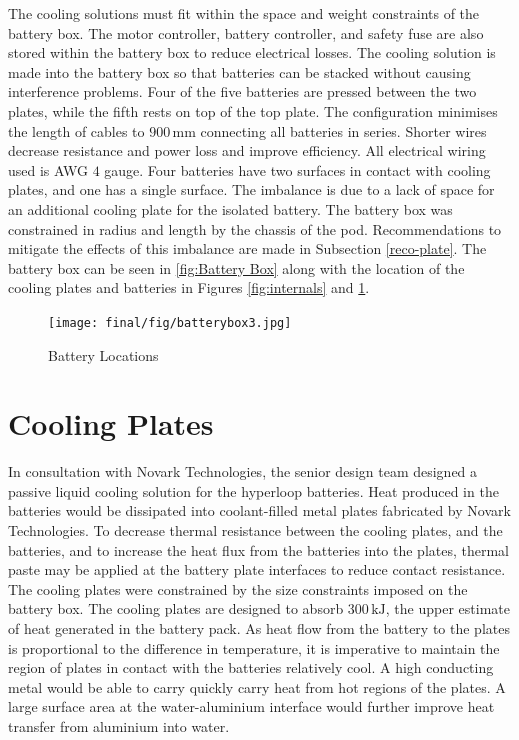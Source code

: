 \documentclass[11pt]{article}
\numberwithin{equation}{subsection} %
\newcommand{\unit}[1]{\ensuremath{\, \mathrm{#1}}}             %
\begin{document}
The cooling solutions must fit within the space and weight constraints of the battery box. The motor controller, battery controller, and safety fuse are also stored within the battery box to reduce electrical losses. The cooling solution is made into the battery box so that batteries can be stacked without causing interference problems. Four of the five batteries are pressed between the two plates, while the fifth rests on top of the top plate. The configuration minimises the length of cables to $900\unit{mm}$ connecting all batteries in series. Shorter wires decrease resistance and power loss and improve efficiency. All electrical wiring used is AWG $4$ gauge. Four batteries have two surfaces in contact with cooling plates, and one has a single surface. The imbalance is due to a lack of space for an additional cooling plate for the isolated battery. The battery box was constrained in radius and length by the chassis of the pod. Recommendations to mitigate the effects of this imbalance are made in Subsection \ref{reco-plate}. The battery box can be seen in \ref{fig:Battery Box} along with the location of the cooling plates and batteries in Figures \ref{fig:internals} and \ref{fig:batteries and plates}.

\begin{figure}[h!]
 \centering
	\texttt{[image: final/fig/batterybox3.jpg]}
    \caption{Battery Locations}
    \label{fig:batteries and plates}
\end{figure}

\section{Cooling Plates}
In consultation with Novark Technologies, the senior design team designed a passive liquid cooling solution for the hyperloop batteries. Heat produced in the batteries would be dissipated into coolant-filled metal plates fabricated by Novark Technologies. To decrease thermal resistance between the cooling plates, and the batteries, and to increase the heat flux from the batteries into the plates, thermal paste may be applied at the battery plate interfaces to reduce contact resistance. The cooling plates were constrained by the size constraints imposed on the battery box. The cooling plates are designed to absorb $300\unit{kJ}$, the upper estimate of heat generated in the battery pack. As heat flow from the battery to the plates is proportional to the difference in temperature, it is imperative to maintain the region of plates in contact with the batteries relatively cool. A high conducting metal would be able to carry quickly carry heat from hot regions of the plates. A large surface area at the water-aluminium interface would further improve heat transfer from aluminium into water.
\end{document}
